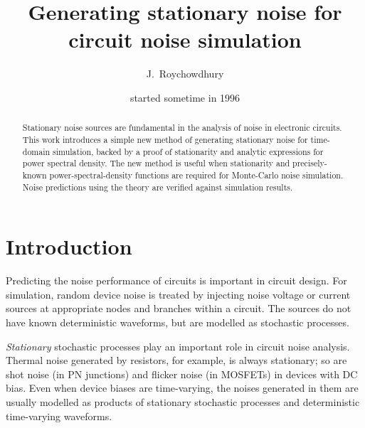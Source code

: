 \newcommand{\w}{\omega}

\newcommand{\ignore}[1]{}



\title{Generating stationary noise for circuit noise simulation}
\author{J.~Roychowdhury}
\date{started sometime in 1996}

\maketitle

\begin{abstract}
Stationary noise sources are fundamental in the analysis of noise in
electronic circuits. This work introduces a simple new method of generating
stationary noise for time-domain simulation, backed by a proof of
stationarity and analytic expressions for power spectral density.  The new
method is useful when stationarity and precisely-known
power-spectral-density functions are required for Monte-Carlo noise
simulation. Noise predictions using the theory are verified against
simulation results.
\end{abstract}

\section{Introduction}
\label{sec:intro}

Predicting the noise performance of circuits is important in circuit design.
For simulation, random device noise is treated by injecting noise voltage or
current sources at appropriate nodes and branches within a circuit. The
sources do not have known deterministic waveforms, but are modelled as
stochastic processes.
	
{\em Stationary} stochastic processes play an important role in circuit
noise analysis. Thermal noise generated by resistors, for example, is always
stationary; so are shot noise (in PN junctions) and flicker noise (in
MOSFETs) in devices with DC bias. Even when device biases are time-varying,
the noises generated in them are usually modelled as products of stationary
stochastic processes and deterministic time-varying waveforms\cite{reference}.

